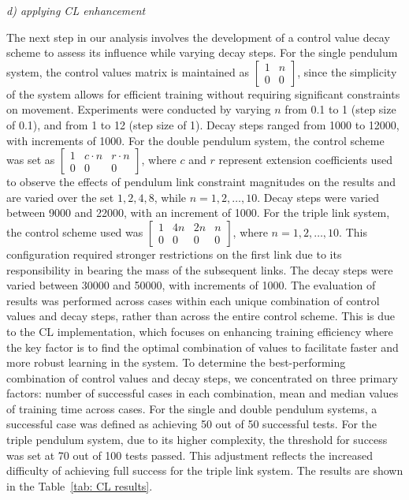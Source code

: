 \textit{d) applying CL enhancement}

The next step in our analysis involves the development of a control value decay scheme to assess its influence while varying decay steps. For the single pendulum system, the control values matrix is maintained as \(\begin{bmatrix} 1 & n \\ 0 & 0 \end{bmatrix}\), since the simplicity of the system allows for efficient training without requiring significant constraints on movement. Experiments were conducted by varying $n$ from 0.1 to 1 (step size of 0.1), and from 1 to 12 (step size of 1). Decay steps ranged from 1000 to 12000, with increments of 1000. 
For the double pendulum system, the control scheme was set as \(\begin{bmatrix} 1 & c \cdot n & r \cdot n \\ 0 & 0 & 0 \end{bmatrix}\), where $c$ and $r$ represent extension coefficients used to observe the effects of pendulum link constraint magnitudes on the results and are varied over the set \({1, 2, 4, 8}\), while \(n = 1, 2, \ldots, 10\). Decay steps were varied between 9000 and 22000, with an increment of 1000. 
For the triple link system, the control scheme used was \(\begin{bmatrix} 1 & 4n & 2n & n \\ 0 & 0 & 0 & 0 \end{bmatrix}\), where \(n = 1, 2, \ldots, 10\). This configuration required stronger restrictions on the first link due to its responsibility in bearing the mass of the subsequent links. The decay steps were varied between 30000 and 50000, with increments of 1000.
The evaluation of results was performed across cases within each unique combination of control values and decay steps, rather than across the entire control scheme. This is due to the CL implementation, which focuses on enhancing training efficiency where the key factor is to find the optimal combination of values to facilitate faster and more robust learning in the system. To determine the best-performing combination of control values and decay steps, we concentrated on three primary factors: number of successful cases in each combination, mean and median values of training time across cases. For the single and double pendulum systems, a successful case was defined as achieving 50 out of 50 successful tests. For the triple pendulum system, due to its higher complexity, the threshold for success was set at 70 out of 100 tests passed. This adjustment reflects the increased difficulty of achieving full success for the triple link system. The results are shown in the Table~\ref{tab: CL results}.

